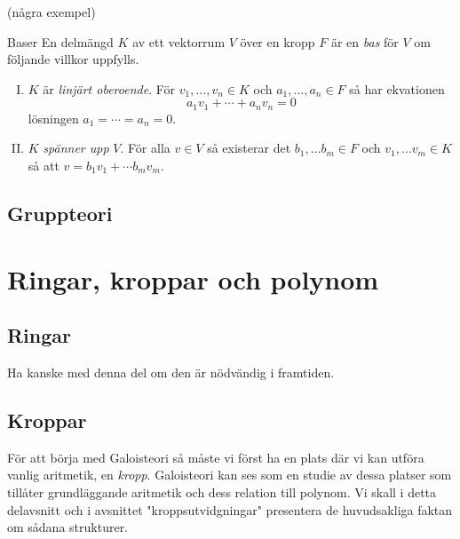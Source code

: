 \documentclass{article}
\theoremstyle{definition}
\begin{document}
(några exempel)

\begin{mydef}{Baser}{}
  En delmängd $K$ av ett vektorrum $V$ över en kropp $F$ är en \textit{bas} för $V$ om följande villkor uppfylls.  
  \begin{enumerate}[I)]
    \item $K$ är \textit{linjärt oberoende}. För $v_1, \ldots, v_n \in K$ och $a_1, \ldots, a_n \in F$ så har ekvationen 
    \[a_1v_1 + \cdots + a_n v_n = 0\]
    lösningen $a_1 = \cdots = a_n = 0$.
    \item $K$ \textit{spänner upp} $V$. För alla $v \in V$ så existerar det $b_1, \ldots b_m \in F$ och $v_1, \ldots v_m \in K$ så att 
    $v = b_1 v_1 + \cdots b_m v_m$.
  \end{enumerate}
\end{mydef}

\subsection{Gruppteori}

\section{Ringar, kroppar och polynom}
\subsection{Ringar}
Ha kanske med denna del om den är nödvändig i framtiden. 
\subsection{Kroppar}
För att börja med Galoisteori så måste vi först ha en plats där vi kan utföra vanlig aritmetik, en \textit{kropp}. Galoisteori kan ses som en studie 
av dessa platser som tillåter grundläggande aritmetik och dess relation till polynom. Vi skall i detta delavsnitt och i avsnittet "kroppsutvidgningar" 
presentera de huvudsakliga faktan om 
sådana strukturer. 
\end{document}
